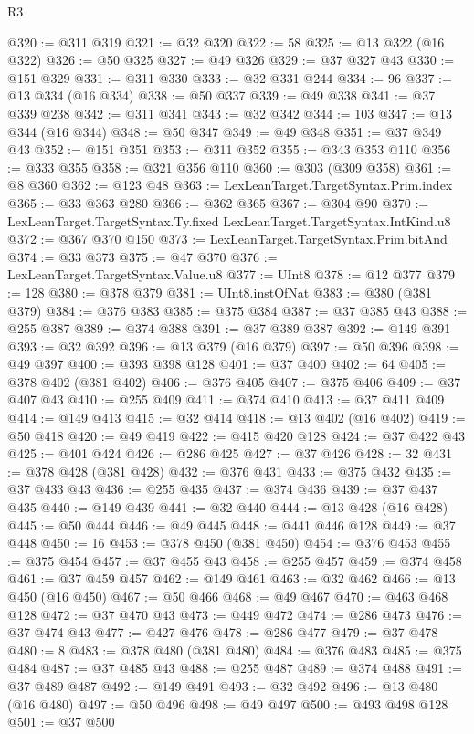 \begin{lexlean}{R3}
\begin{coremodule}
@320 := @311 @319
@321 := @32 @320
@322 := 58
@325 := @13 @322 (@16 @322)
@326 := @50 @325
@327 := @49 @326
@329 := @37 @327 @43
@330 := @151 @329
@331 := @311 @330
@333 := @32 @331 @244
@334 := 96
@337 := @13 @334 (@16 @334)
@338 := @50 @337
@339 := @49 @338
@341 := @37 @339 @238
@342 := @311 @341
@343 := @32 @342
@344 := 103
@347 := @13 @344 (@16 @344)
@348 := @50 @347
@349 := @49 @348
@351 := @37 @349 @43
@352 := @151 @351
@353 := @311 @352
@355 := @343 @353 @110
@356 := @333 @355
@358 := @321 @356 @110
@360 := @303 (@309 @358)
@361 := @8 @360
@362 := @123 @48
@363 := LexLeanTarget.TargetSyntax.Prim.index
@365 := @33 @363 @280
@366 := @362 @365
@367 := @304 @90
@370 := LexLeanTarget.TargetSyntax.Ty.fixed LexLeanTarget.TargetSyntax.IntKind.u8
@372 := @367 @370 @150
@373 := LexLeanTarget.TargetSyntax.Prim.bitAnd
@374 := @33 @373
@375 := @47 @370
@376 := LexLeanTarget.TargetSyntax.Value.u8
@377 := UInt8
@378 := @12 @377
@379 := 128
@380 := @378 @379
@381 := UInt8.instOfNat
@383 := @380 (@381 @379)
@384 := @376 @383
@385 := @375 @384
@387 := @37 @385 @43
@388 := @255 @387
@389 := @374 @388
@391 := @37 @389 @387
@392 := @149 @391
@393 := @32 @392
@396 := @13 @379 (@16 @379)
@397 := @50 @396
@398 := @49 @397
@400 := @393 @398 @128
@401 := @37 @400
@402 := 64
@405 := @378 @402 (@381 @402)
@406 := @376 @405
@407 := @375 @406
@409 := @37 @407 @43
@410 := @255 @409
@411 := @374 @410
@413 := @37 @411 @409
@414 := @149 @413
@415 := @32 @414
@418 := @13 @402 (@16 @402)
@419 := @50 @418
@420 := @49 @419
@422 := @415 @420 @128
@424 := @37 @422 @43
@425 := @401 @424
@426 := @286 @425
@427 := @37 @426
@428 := 32
@431 := @378 @428 (@381 @428)
@432 := @376 @431
@433 := @375 @432
@435 := @37 @433 @43
@436 := @255 @435
@437 := @374 @436
@439 := @37 @437 @435
@440 := @149 @439
@441 := @32 @440
@444 := @13 @428 (@16 @428)
@445 := @50 @444
@446 := @49 @445
@448 := @441 @446 @128
@449 := @37 @448
@450 := 16
@453 := @378 @450 (@381 @450)
@454 := @376 @453
@455 := @375 @454
@457 := @37 @455 @43
@458 := @255 @457
@459 := @374 @458
@461 := @37 @459 @457
@462 := @149 @461
@463 := @32 @462
@466 := @13 @450 (@16 @450)
@467 := @50 @466
@468 := @49 @467
@470 := @463 @468 @128
@472 := @37 @470 @43
@473 := @449 @472
@474 := @286 @473
@476 := @37 @474 @43
@477 := @427 @476
@478 := @286 @477
@479 := @37 @478
@480 := 8
@483 := @378 @480 (@381 @480)
@484 := @376 @483
@485 := @375 @484
@487 := @37 @485 @43
@488 := @255 @487
@489 := @374 @488
@491 := @37 @489 @487
@492 := @149 @491
@493 := @32 @492
@496 := @13 @480 (@16 @480)
@497 := @50 @496
@498 := @49 @497
@500 := @493 @498 @128
@501 := @37 @500

\end{coremodule}
\end{lexlean}
